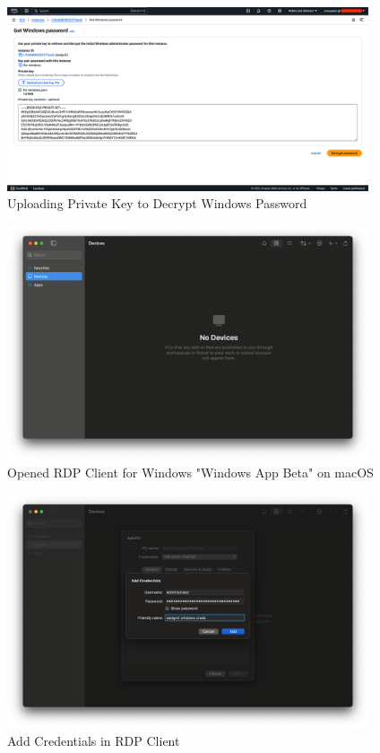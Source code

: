 \documentclass[a4paper,12pt]{article}
\begin{document}
\begin{figure}[H]
    \centering
    \includegraphics[width=0.95\textwidth]{connect-to-vm-2.png}
    \caption{Uploading Private Key to Decrypt Windows Password}
    \label{fig:connect2}
\end{figure}

\begin{figure}[H]
    \centering
    \includegraphics[width=0.95\textwidth]{connect-to-vm-3.png}
    \caption{Opened RDP Client for Windows "Windows App Beta" on macOS}
    \label{fig:connect3}
\end{figure}

\begin{figure}[H]
    \centering
    \includegraphics[width=0.95\textwidth]{connect-to-vm-4.png}
    \caption{Add Credentials in RDP Client}
    \label{fig:connect4}
\end{figure}
\end{document}
